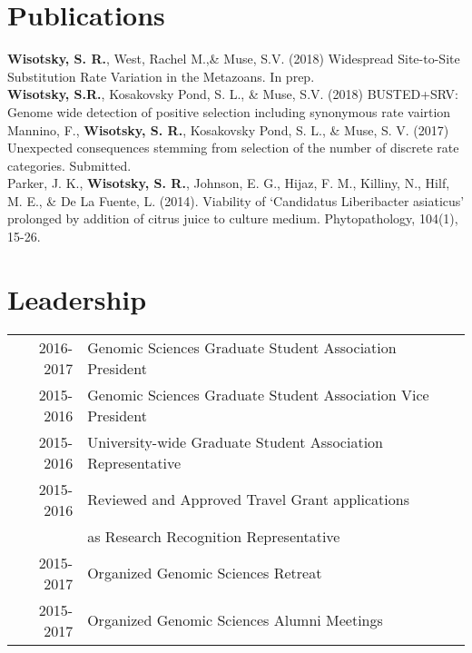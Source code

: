 \documentclass[]{deedy-resume-openfont}
\begin{document}
\begin{minipage}[t]{0.66\textwidth}
\section{Publications}
\textbf{Wisotsky, S. R.}, West, Rachel M.,\& Muse, S.V. (2018) Widespread Site-to-Site Substitution Rate Variation in the Metazoans. In prep.\\
\vspace{3pt}
\textbf{Wisotsky, S.R.}, Kosakovsky Pond, S. L., \& Muse, S.V. (2018) BUSTED+SRV: Genome wide detection of positive selection including synonymous rate vairtion \\
\vspace{3pt}
Mannino, F., \textbf{Wisotsky, S. R.}, Kosakovsky Pond, S. L., \& Muse, S. V. (2017) Unexpected consequences stemming from selection of the number of discrete rate categories. Submitted.   \\
\vspace{3pt}
Parker, J. K., \textbf{Wisotsky, S. R.}, Johnson, E. G., Hijaz, F. M., Killiny, N., Hilf, M. E., \& De La Fuente, L. (2014). Viability of ‘Candidatus Liberibacter asiaticus’ prolonged by addition of citrus juice to culture medium. Phytopathology, 104(1), 15-26.\\
\sectionsep



\section{Leadership} 

\begin{tabular}{rll}
2016-2017 	& Genomic Sciences Graduate Student Association President  \\
2015-2016   & Genomic Sciences Graduate Student Association Vice President \\
2015-2016   & University-wide Graduate Student Association Representative \\
2015-2016   & Reviewed and Approved Travel Grant applications \\
			& as Research Recognition Representative \\
2015-2017	& Organized Genomic Sciences Retreat \\
2015-2017   & Organized Genomic Sciences Alumni Meetings \\
\end{tabular}
\sectionsep

\end{minipage} 
\end{document}
